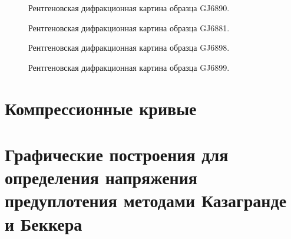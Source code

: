   \begin{figure}[ht]
    \caption{Рентгеновская дифракционная картина образца GJ6890.}\label{fig:fig}
  \end{figure}

  \begin{figure}[ht]
    \caption{Рентгеновская дифракционная картина образца GJ6881.}\label{fig:fig}
  \end{figure}

  \begin{figure}[ht]
    \caption{Рентгеновская дифракционная картина образца GJ6898.}\label{fig:fig}
  \end{figure}

  \begin{figure}[ht]
    \caption{Рентгеновская дифракционная картина образца GJ6899.}\label{fig:fig}
  \end{figure}

  \chapter{Компрессионные кривые}\label{app:oedometer}
  

  \chapter{Графические построения для определения напряжения
  предуплотения методами Казагранде и Беккера}\label{app:method}
  